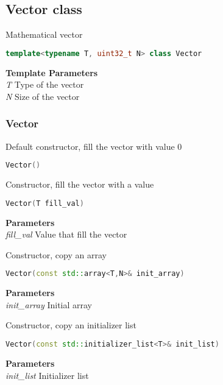 \subsection{Vector  class}
Mathematical vector
\begin{lstlisting}[language=C++]
template<typename T, uint32_t N> class Vector 
\end{lstlisting}
\textbf{Template Parameters} \\ 
\textit{T} Type of the vector \\ 
\textit{N} Size of the vector \\ 

\subsubsection{Vector}
\begin{mdframed}
Default constructor, fill the vector with value 0
\begin{lstlisting}[language=C++]
Vector()
\end{lstlisting}
\end{mdframed}

\begin{mdframed}
Constructor, fill the vector with a value
\begin{lstlisting}[language=C++]
Vector(T fill_val)
\end{lstlisting}
\textbf{Parameters} \\ 
\textit{fill\_val} Value that fill the vector \\ 
\end{mdframed}

\begin{mdframed}
Constructor, copy an array
\begin{lstlisting}[language=C++]
Vector(const std::array<T,N>& init_array)
\end{lstlisting}
\textbf{Parameters} \\ 
\textit{init\_array} Initial array \\ 
\end{mdframed}

\begin{mdframed}
Constructor, copy an initializer list
\begin{lstlisting}[language=C++]
Vector(const std::initializer_list<T>& init_list)
\end{lstlisting}
\textbf{Parameters} \\ 
\textit{init\_list} Initializer list \\ 
\end{mdframed}

